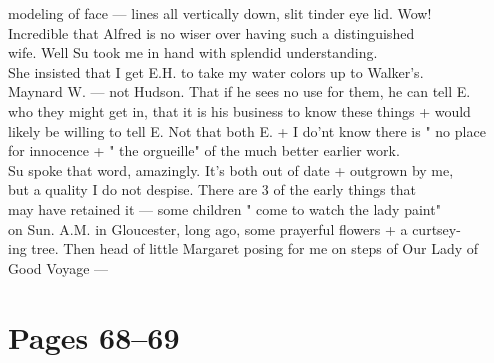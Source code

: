 \documentclass[11pt,a4paper]{article}
\begin{document}
{modeling of face --- lines all vertically down, slit tinder eye lid. Wow! \\
Incredible that Alfred is no wiser over having such a distinguished \\
wife. Well Su took me in hand with splendid understanding. \\
She insisted that I get E.H. to take my water colors up to Walker's. \\
Maynard W. --- not Hudson. That if he sees no use for them, he can tell E. \\
who they might get in, that it is his business to know these things + would \\
likely be willing to tell E. Not that both E. + I do'nt know there is " no place \\
for innocence +  " the orgueille" of the much better earlier work. \\
Su spoke that word, amazingly. It's both out of date + outgrown by me, \\
but a quality I do not despise. There are 3 of the early things that \\
may have retained it --- some children " come to watch the lady paint" \\
on Sun. A.M. in Gloucester, long ago, some prayerful flowers + a curtsey- \\
ing tree. Then head of little Margaret posing for me on steps of Our Lady of \\
\qquad \qquad Good Voyage ---}









\section{Pages 68--69}
\end{document}
